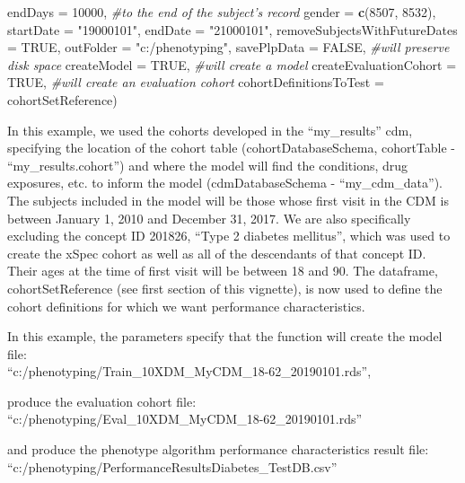 \documentclass[
]{article}
\newenvironment{Shaded}{\begin{snugshade}}{\end{snugshade}}
\newcommand{\CommentTok}[1]{\textcolor[rgb]{0.56,0.35,0.01}{\textit{#1}}}
\newcommand{\DataTypeTok}[1]{\textcolor[rgb]{0.13,0.29,0.53}{#1}}
\newcommand{\DecValTok}[1]{\textcolor[rgb]{0.00,0.00,0.81}{#1}}
\newcommand{\KeywordTok}[1]{\textcolor[rgb]{0.13,0.29,0.53}{\textbf{#1}}}
\newcommand{\NormalTok}[1]{#1}
\newcommand{\OtherTok}[1]{\textcolor[rgb]{0.56,0.35,0.01}{#1}}
\newcommand{\StringTok}[1]{\textcolor[rgb]{0.31,0.60,0.02}{#1}}
\begin{document}
\begin{Shaded}
\begin{Highlighting}[]
                \DataTypeTok{endDays =} \DecValTok{10000}\NormalTok{, }\CommentTok{#to the end of the subject's record}
                \DataTypeTok{gender =} \KeywordTok{c}\NormalTok{(}\DecValTok{8507}\NormalTok{, }\DecValTok{8532}\NormalTok{),}
                \DataTypeTok{startDate =} \StringTok{"19000101"}\NormalTok{,}
                \DataTypeTok{endDate =} \StringTok{"21000101"}\NormalTok{,}
                \DataTypeTok{removeSubjectsWithFutureDates =} \OtherTok{TRUE}\NormalTok{,}
                \DataTypeTok{outFolder =} \StringTok{"c:/phenotyping"}\NormalTok{,}
                \DataTypeTok{savePlpData =} \OtherTok{FALSE}\NormalTok{, }\CommentTok{#will preserve disk space}
                \DataTypeTok{createModel =} \OtherTok{TRUE}\NormalTok{, }\CommentTok{#will create a model}
                \DataTypeTok{createEvaluationCohort =} \OtherTok{TRUE}\NormalTok{, }\CommentTok{#will create an evaluation cohort}
                \DataTypeTok{cohortDefinitionsToTest =}\NormalTok{ cohortSetReference)}
\end{Highlighting}
\end{Shaded}

In this example, we used the cohorts developed in the ``my\_results''
cdm, specifying the location of the cohort table (cohortDatabaseSchema,
cohortTable - ``my\_results.cohort'') and where the model will find the
conditions, drug exposures, etc. to inform the model (cdmDatabaseSchema
- ``my\_cdm\_data''). The subjects included in the model will be those
whose first visit in the CDM is between January 1, 2010 and December 31,
2017. We are also specifically excluding the concept ID 201826, ``Type 2
diabetes mellitus'', which was used to create the xSpec cohort as well
as all of the descendants of that concept ID. Their ages at the time of
first visit will be between 18 and 90. The dataframe, cohortSetReference
(see first section of this vignette), is now used to define the cohort
definitions for which we want performance characteristics.

In this example, the parameters specify that the function will create
the model file:\\
``c:/phenotyping/Train\_10XDM\_MyCDM\_18-62\_20190101.rds'',

produce the evaluation cohort file:\\
``c:/phenotyping/Eval\_10XDM\_MyCDM\_18-62\_20190101.rds''

and produce the phenotype algorithm performance characteristics result
file:\\
``c:/phenotyping/PerformanceResultsDiabetes\_TestDB.csv''
\end{document}
